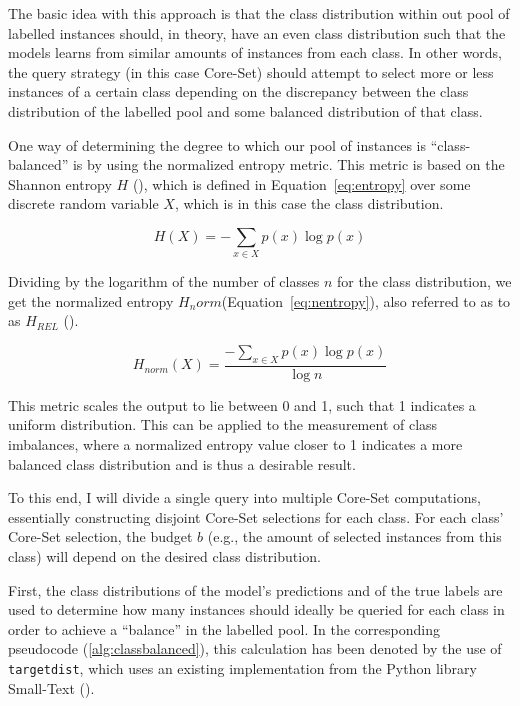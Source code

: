 \documentclass[english,bachelor,ul]{webisthesis} %
\begin{document}
The basic idea with this approach is that the class distribution within out pool of labelled instances should, in theory, have an even class distribution such that the models learns from similar amounts of instances from each class. In other words, the query strategy (in this case Core-Set) should attempt to select more or less instances of a certain class depending on the discrepancy between the class distribution of the labelled pool and some balanced distribution of that class.

One way of determining the degree to which our pool of instances is ``class-balanced'' is by using the normalized entropy metric. This metric is based on the Shannon entropy $ H $ (\cite{DBLP:journals/bstj/Shannon48}), which is defined in Equation~\ref{eq:entropy} over some discrete random variable $ X $, which is in this case the class distribution.

\begin{equation}\label{eq:entropy}
    H(X) = -\sum_{x \in X} p(x) \log p(x)
\end{equation}

Dividing by the logarithm of the number of classes $n$ for the class distribution, we get the normalized entropy $ H_norm $(Equation~\ref{eq:nentropy}), also referred to as to as $ H_{REL} $ (\cite{wilcox1967indices}).

\begin{equation}\label{eq:nentropy}
    H_{norm}(X) = \frac{-\sum_{x \in X} p(x) \log p(x)}{\log n}
\end{equation}

This metric scales the output to lie between 0 and 1, such that 1 indicates a uniform distribution. This can be applied to the measurement of class imbalances, where a normalized entropy value closer to 1 indicates a more balanced class distribution and is thus a desirable result. 

To this end, I will divide a single query into multiple Core-Set computations, essentially constructing disjoint Core-Set selections for each class. For each class' Core-Set selection, the budget $ b $ (e.g., the amount of selected instances from this class) will depend on the desired class distribution.

First, the class distributions of the model's predictions and of the true labels are used to determine how many instances should ideally be queried for each class in order to achieve a ``balance'' in the labelled pool. In the corresponding pseudocode (\ref{alg:classbalanced}), this calculation has been denoted by the use of \texttt{target\textunderscore dist}, which uses an existing implementation from the Python library Small-Text (\cite{schroeder2023small-text}).
\end{document}
